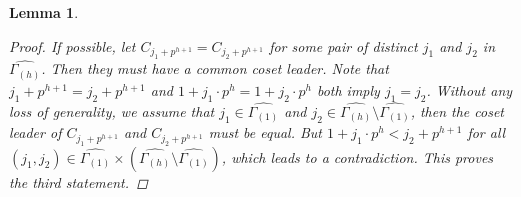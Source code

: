 \documentclass[pdflatex,sn-mathphys-num]{sn-jnl}%
\newtheorem{lemma}{Lemma}
\theoremstyle{thmstyleone}%
\theoremstyle{thmstyletwo}%
\theoremstyle{thmstylethree}%
\begin{document}
\begin{lemma}
\begin{proof}
        \par If possible, let $C_{j_{1}+p^{h+1}}= C_{j_{2}+p^{h+1}}$ for some pair of distinct $j_{1}$ and $j_{2}$ in $\widehat{\Gamma_{(h)}}$. Then they must have a common coset leader. Note that $j_{1}+p^{h+1}= j_{2}+p^{h+1}$ and $1+j_{1}\cdot p^{h}= 1+j_{2}\cdot p^{h}$ both imply $j_{1}=j_{2}$. Without any loss of generality, we assume that $j_{1}\in\widehat{\Gamma_{(1)}}$ and $j_{2}\in\widehat{\Gamma_{(h)}}\setminus\widehat{\Gamma_{(1)}}$, then the coset leader of $C_{j_{1}+p^{h+1}}$ and $C_{j_{2}+p^{h+1}}$ must be equal. But $1+j_{1}\cdot p^h<j_{2}+p^{h+1}$ for all $(j_{1},j_{2})\in\widehat{\Gamma_{(1)}}\times(\widehat{\Gamma_{(h)}}\setminus\widehat{\Gamma_{(1)}})$, which leads to a contradiction. This proves the third statement. 
    \end{proof}
\end{lemma}
\end{document}
